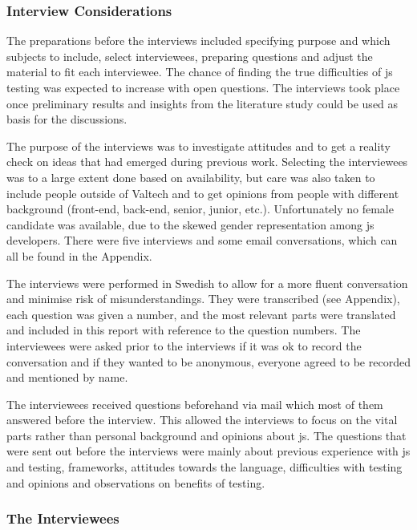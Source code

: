 \documentclass[11pt]{article}
\begin{document}
\subsubsection{Interview Considerations}

The preparations before the interviews included specifying purpose and which subjects to include, select interviewees, preparing questions and adjust the material to fit each interviewee. The chance of finding the true difficulties of \gls{js} testing was expected to increase with open questions. The interviews took place once preliminary results and insights from the literature study could be used as basis for the discussions.

The purpose of the interviews was to investigate attitudes and to get a reality check on ideas that had emerged during previous work. Selecting the interviewees was to a large extent done based on availability, but care was also taken to include people outside of Valtech and to get opinions from people with different background (front-end, back-end, senior, junior, etc.). Unfortunately no female candidate was available, due to the skewed gender representation among \gls{js} developers. There were five interviews and some email conversations, which can all be found in the Appendix.

The interviews were performed in Swedish to allow for a more fluent conversation and minimise risk of misunderstandings. They were transcribed (see Appendix), each question was given a number, and the most relevant parts were translated and included in this report with reference to the question numbers. The interviewees were asked prior to the interviews if it was ok to record the conversation and if they wanted to be anonymous, everyone agreed to be recorded and mentioned by name.

The interviewees received questions beforehand via mail which most of them answered before the interview. This allowed the interviews to focus on the vital parts rather than personal background and opinions about \gls{js}. The questions that were sent out before the interviews were mainly about previous experience with \gls{js} and testing, frameworks, attitudes towards the language, difficulties with testing and opinions and observations on benefits of testing.

\subsubsection{The Interviewees}
\label{ssubsec:interviewees}
\end{document}
